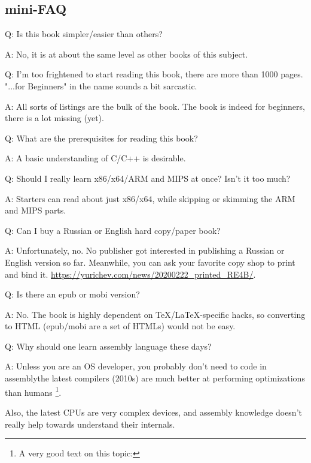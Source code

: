 \subsection*{mini-FAQ}

\par Q: Is this book simpler/easier than others?
\par A: No, it is at about the same level as other books of this subject.

\par Q: I'm too frightened to start reading this book, there are more than 1000 pages.
"...for Beginners" in the name sounds a bit sarcastic.
\par A: All sorts of listings are the bulk of the book.
The book is indeed for beginners, there is a lot missing (yet).

\par Q: What are the prerequisites for reading this book?
\par A: A basic understanding of C/C++ is desirable.

\par Q: Should I really learn x86/x64/ARM and MIPS at once? Isn't it too much?
\par A: Starters can read about just x86/x64, while skipping or skimming the ARM and MIPS parts.

\par Q: Can I buy a Russian or English hard copy/paper book?
\par A: Unfortunately, no. No publisher got interested in publishing a Russian or English version so far.
Meanwhile, you can ask your favorite copy shop to print and bind it.
\url{https://yurichev.com/news/20200222_printed_RE4B/}.

\par Q: Is there an epub or mobi version?
\par A: No. The book is highly dependent on TeX/LaTeX-specific hacks, so converting to HTML (epub/mobi are a set of HTMLs)
would not be easy.

\par Q: Why should one learn assembly language these days?
\par A: Unless you are an \ac{OS} developer, you probably don't need to code in assembly\textemdash{}the latest compilers (2010s) are much better at performing optimizations than humans \footnote{A very good text on this topic: \InSqBrackets{\AgnerFog}}.

Also, the latest \ac{CPU}s are very complex devices, and assembly knowledge doesn't really help towards understand their internals.

